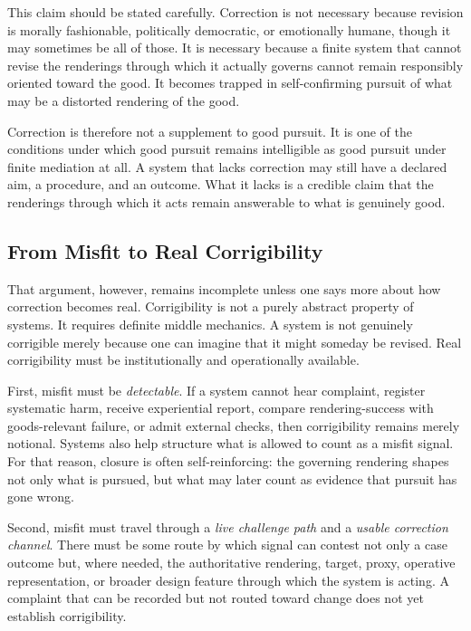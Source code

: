 \documentclass[11pt]{article}
\renewcommand{\emph}[1]{\textit{#1}}
\begin{document}
This claim should be stated carefully. Correction is not necessary because revision is morally fashionable, politically democratic, or emotionally humane, though it may sometimes be all of those. It is necessary because a finite system that cannot revise the renderings through which it actually governs cannot remain responsibly oriented toward the good. It becomes trapped in self-confirming pursuit of what may be a distorted rendering of the good.

Correction is therefore not a supplement to good pursuit. It is one of the conditions under which good pursuit remains intelligible as good pursuit under finite mediation at all. A system that lacks correction may still have a declared aim, a procedure, and an outcome. What it lacks is a credible claim that the renderings through which it acts remain answerable to what is genuinely good.

\subsection{From Misfit to Real Corrigibility}

That argument, however, remains incomplete unless one says more about how correction becomes real. Corrigibility is not a purely abstract property of systems. It requires definite middle mechanics. A system is not genuinely corrigible merely because one can imagine that it might someday be revised. Real corrigibility must be institutionally and operationally available.\cite{Swanson2026CorrectiveEthicsConstraint,MoynihanHerdHarvey2015AdministrativeBurden,Eubanks2018AutomatingInequality}

First, misfit must be \emph{detectable}. If a system cannot hear complaint, register systematic harm, receive experiential report, compare rendering-success with goods-relevant failure, or admit external checks, then corrigibility remains merely notional. Systems also help structure what is allowed to count as a misfit signal. For that reason, closure is often self-reinforcing: the governing rendering shapes not only what is pursued, but what may later count as evidence that pursuit has gone wrong.

Second, misfit must travel through a \emph{live challenge path} and a \emph{usable correction channel}. There must be some route by which signal can contest not only a case outcome but, where needed, the authoritative rendering, target, proxy, operative representation, or broader design feature through which the system is acting. A complaint that can be recorded but not routed toward change does not yet establish corrigibility.
\end{document}
